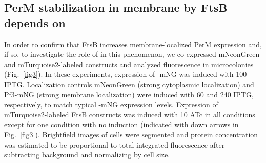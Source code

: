 \documentclass[pdflatex,sn-basic]{sn-jnl}%
\begin{document}
\subsection{PerM stabilization in \ec{} membrane by FtsB depends on \ftsbH{}}

In order to confirm that FtsB increases membrane-localized PerM expression and, if so, to investigate the role of \ftsbH{} in this phenomenon, we co-expressed mNeonGreen- and mTurquoise2-labeled constructs and analyzed fluorescence in \ec{} microcolonies (Fig.~\ref{fig3}). In these experiments, expression of \permN{}-mNG was induced with \qty{100}{\uM} IPTG. Localization controls mNeonGreen (strong cytoplasmic localization) and Pf3-mNG (strong membrane localization) were induced with \qty{60}{\uM} and \qty{240}{\uM} IPTG, respectively, to match typical \permN{}-mNG expression levels. Expression of mTurquoise2-labeled FtsB constructs was induced with \qty{10}{\nM} ATc in all conditions except for one condition with no induction (indicated with down arrows in Fig.~\ref{fig3}). Brightfield images of \ec{} cells were segmented and protein concentration was estimated to be proportional to total integrated fluorescence after subtracting background and normalizing by cell size.
\end{document}
